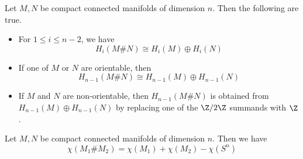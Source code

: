\documentclass[a4paper]{article}
\begin{document}
\begin{prp}{}{} Let $M,N$ be compact connected manifolds of dimension $n$. Then the following are true. 
\begin{itemize}
\item For $1\leq i\leq n-2$, we have $$H_i(M\# N)\cong H_i(M)\oplus H_i(N)$$
\item If one of $M$ or $N$ are orientable, then $$H_{n-1}(M\# N)\cong H_{n-1}(M)\oplus H_{n-1}(N)$$
\item If $M$ and $N$ are non-orientable, then $H_{n-1}(M\# N)$ is obtained from $H_{n-1}(M)\oplus H_{n-1}(N)$ by replacing one of the $\Z/2\Z$ summands with $\Z$. 
\end{itemize}
\end{prp}

\begin{lmm}{}{} Let $M,N$ be compact connected manifolds of dimension $n$. Then we have $$\chi(M_1\# M_2)=\chi(M_1)+\chi(M_2)-\chi(S^n)$$
\end{lmm}
\end{document}
